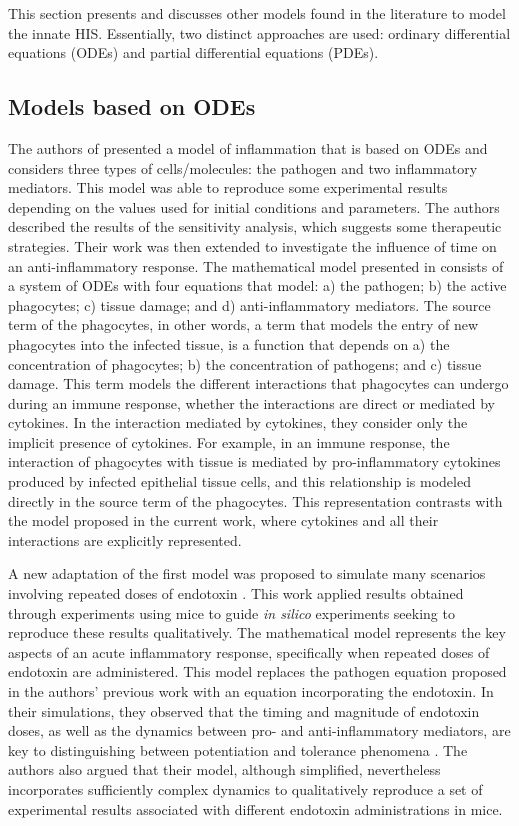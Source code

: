 \documentclass[10pt]{bmc_article}
\newenvironment{bmcformat}{\baselineskip20pt\sloppy\setboolean{publ}{false}}{\baselineskip20pt\sloppy}
\begin{document}
\begin{bmcformat}
This section presents and discusses other models found in the literature to model the innate HIS. Essentially, two distinct approaches 
are used: ordinary differential equations (ODEs) and partial differential equations (PDEs). 

\subsection*{Models based on ODEs}

The authors of \cite{Kumar2004} presented a model of inflammation that is based on ODEs and considers three types of cells/molecules: 
the pathogen and two inflammatory mediators. This model was able to reproduce some experimental results depending on the values used 
for initial conditions and parameters. The authors described the results of the sensitivity analysis, which suggests some therapeutic 
strategies. Their work was then extended\cite{reynolds1} to investigate the influence of time on an anti-inflammatory response. The 
mathematical model presented in \cite{reynolds1} consists of a system of ODEs with four equations that model: a) the pathogen; b) the 
active phagocytes; c) tissue damage; and d) anti-inflammatory mediators. The source term of the phagocytes, in other words, a term 
that models the entry of new phagocytes into the infected tissue, is a function that depends on a) the concentration of phagocytes; 
b) the concentration of pathogens; and c) tissue damage. This term models the different interactions that phagocytes can undergo 
during an immune response, whether the interactions are direct or mediated by cytokines. In the interaction mediated by cytokines, 
they consider only the implicit presence of cytokines. For example, in an immune response, the interaction of phagocytes with tissue 
is mediated by pro-inflammatory cytokines produced by infected epithelial tissue cells, and this relationship is modeled directly in 
the source term of the phagocytes. This representation contrasts with the model proposed in the current work, where cytokines and 
all their interactions are explicitly represented. 

A new adaptation of the first model \cite{Kumar2004} was proposed to simulate many scenarios involving repeated doses of 
endotoxin \cite{reynolds2}. This work applied results obtained through experiments using mice to guide \textit{in silico} experiments 
seeking to reproduce these results qualitatively. The mathematical model represents the key aspects of an acute inflammatory response, 
specifically when repeated doses of endotoxin are administered. This model replaces the pathogen equation proposed in the authors' 
previous work \cite{reynolds1} with an equation incorporating the endotoxin. In their simulations, they observed that the timing and 
magnitude of endotoxin doses, as well as the dynamics between pro- and anti-inflammatory mediators, are key to distinguishing between 
potentiation and tolerance phenomena \cite{reynolds2}. The authors also argued that their model, although simplified, nevertheless 
incorporates sufficiently complex dynamics to qualitatively reproduce a set of experimental results associated with different endotoxin 
administrations in mice. 


\end{bmcformat}
\end{document}
